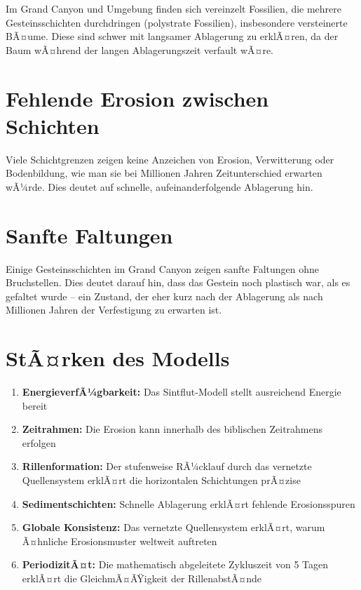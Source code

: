 ﻿\documentclass[12pt,a4paper]{report}
\begin{document}
Im Grand Canyon und Umgebung finden sich vereinzelt Fossilien, die mehrere Gesteinsschichten durchdringen (polystrate Fossilien), insbesondere versteinerte BÃ¤ume. Diese sind schwer mit langsamer Ablagerung zu erklÃ¤ren, da der Baum wÃ¤hrend der langen Ablagerungszeit verfault wÃ¤re.

\section{Fehlende Erosion zwischen Schichten}

Viele Schichtgrenzen zeigen keine Anzeichen von Erosion, Verwitterung oder Bodenbildung, wie man sie bei Millionen Jahren Zeitunterschied erwarten wÃ¼rde. Dies deutet auf schnelle, aufeinanderfolgende Ablagerung hin.

\section{Sanfte Faltungen}

Einige Gesteinsschichten im Grand Canyon zeigen sanfte Faltungen ohne Bruchstellen. Dies deutet darauf hin, dass das Gestein noch plastisch war, als es gefaltet wurde -- ein Zustand, der eher kurz nach der Ablagerung als nach Millionen Jahren der Verfestigung zu erwarten ist.

\section{StÃ¤rken des Modells}

\begin{enumerate}
	\item \textbf{EnergieverfÃ¼gbarkeit:} Das Sintflut-Modell stellt ausreichend Energie bereit
	\item \textbf{Zeitrahmen:} Die Erosion kann innerhalb des biblischen Zeitrahmens erfolgen
	\item \textbf{Rillenformation:} Der stufenweise RÃ¼cklauf durch das vernetzte Quellensystem erklÃ¤rt die horizontalen Schichtungen prÃ¤zise
	\item \textbf{Sedimentschichten:} Schnelle Ablagerung erklÃ¤rt fehlende Erosionsspuren
	\item \textbf{Globale Konsistenz:} Das vernetzte Quellensystem erklÃ¤rt, warum Ã¤hnliche Erosionsmuster weltweit auftreten
	\item \textbf{PeriodizitÃ¤t:} Die mathematisch abgeleitete Zykluszeit von 5 Tagen erklÃ¤rt die GleichmÃ¤ÃŸigkeit der RillenabstÃ¤nde
\end{enumerate}
\end{document}
